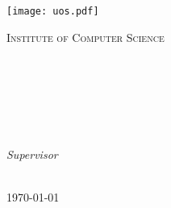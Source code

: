 \begin{titlepage}
	\centering
	\thispagestyle{empty}
	\begin{center}
		\texttt{[image: uos.pdf]}
	\end{center}
	\Large{\textsc{Institute of Computer Science}}
	\vfill
	\textsc{\Large{\emph{\mycourse}}}\\[0.5cm]
	\ifx\status\draft{}
		\MakeUppercase{\textbf{\textit{\status}}}\\
	\fi
	\HRule\\[0.4cm]
	\vspace{8mm}
	\Large{\textbf{{\selectfont\myMaintitle}}}\\
	\vspace{8mm}
	\HRule\\[0.4cm]
	\vspace{9mm}

	\textsc{\myName}\\
	\textsc{\myMatrikel}

	\vspace{1.5cm}
	\large
	\textit{Supervisor}\\
	\textsc{\fistSupervisor}\\
	\textsc{\secSupervisor}


	\vspace{3.2cm}
	\large{\today}
	\vfill
	\end{titlepage}
	\newpage
